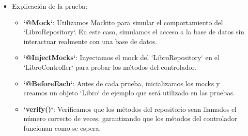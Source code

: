 \documentclass[11pt]{article}
\begin{document}
\begin{itemize}
\begin{verbatim}
        Page<Libro> result = libroController.listarLibros(null, null, pageable);

        assertEquals(1, result.getTotalElements());
        verify(libroRepository, times(1)).findAll(pageable);
    }

    @Test
    void obtenerLibro() {
        when(libroRepository.findById(1L)).thenReturn(Optional.of(libro));

        ResponseEntity<Libro> response = libroController.obtenerLibro(1L);

        assertEquals(HttpStatus.OK, response.getStatusCode());
        assertEquals(libro, response.getBody());
        verify(libroRepository, times(1)).findById(1L);
    }

    @Test
    void crearLibro() {
        when(libroRepository.save(libro)).thenReturn(libro);

        ResponseEntity<Libro> response = libroController.crearLibro(libro);

        assertEquals(HttpStatus.OK, response.getStatusCode());
        assertEquals(libro, response.getBody());
        verify(libroRepository, times(1)).save(libro);
    }

    @Test
    void eliminarLibro() {
        when(libroRepository.findById(1L)).thenReturn(Optional.of(libro));
        doNothing().when(libroRepository).delete(libro);

        ResponseEntity<Void> response = libroController.eliminarLibro(1L);

        assertEquals(HttpStatus.NO_CONTENT, response.getStatusCode());
        verify(libroRepository, times(1)).findById(1L);
        verify(libroRepository, times(1)).delete(libro);
    }
}
\end{verbatim}

\item Explicación de la prueba:
\label{sec:org3e99c68}
\begin{itemize}
\item \textbf{\textbf{`@Mock`}}: Utilizamos Mockito para simular el comportamiento del `LibroRepository`. En este caso, simulamos el acceso a la base de datos sin interactuar realmente con una base de datos.
\item \textbf{\textbf{`@InjectMocks`}}: Inyectamos el mock del `LibroRepository` en el `LibroController` para probar los métodos del controlador.
\item \textbf{\textbf{`@BeforeEach`}}: Antes de cada prueba, inicializamos los mocks y creamos un objeto `Libro` de ejemplo que será utilizado en las pruebas.
\item \textbf{\textbf{`verify()`}}: Verificamos que los métodos del repositorio sean llamados el número correcto de veces, garantizando que los métodos del controlador funcionan como se espera.
\end{itemize}


\end{itemize}
\end{document}
